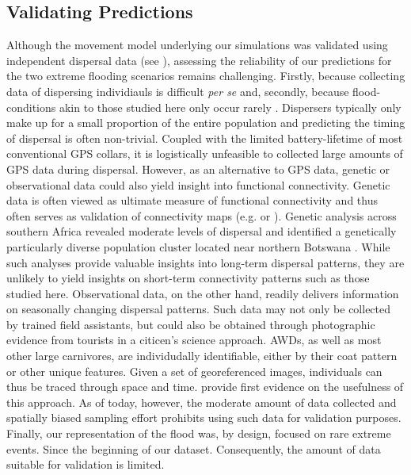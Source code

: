 \documentclass[abstract=on,10pt,a4paper,bibliography=totocnumbered]{article}
\begin{document}
\subsection{Validating Predictions}
Although the movement model underlying our simulations was validated using
independent dispersal data (see \citealp{Hofmann.2023}), assessing the
reliability of our predictions for the two extreme flooding scenarios remains
challenging. Firstly, because collecting data of dispersing individiauls is
difficult \textit{per se} \citep{Fattebert.2015, Cozzi.2020} and, secondly,
because flood-conditions akin to those studied here only occur rarely
\citep{Wolski.2017}. Dispersers typically only make up for a small proportion of
the entire population and predicting the timing of dispersal is often
non-trivial. Coupled with the limited battery-lifetime of most conventional GPS
collars, it is logistically unfeasible to collected large amounts of GPS data
during dispersal. However, as an alternative to GPS data, genetic or
observational data could also yield insight into functional connectivity.
Genetic data is often viewed as ultimate measure of functional connectivity
\citep{Baguette.2013} and thus often serves as validation of connectivity maps
(e.g. \citealp{Cushman.2010} or \citealp{Spear.2010}). Genetic analysis across
southern Africa revealed moderate levels of dispersal and identified a
genetically particularly diverse population cluster located near northern
Botswana \citep{Tensen.2022}. While such analyses provide valuable insights into
long-term dispersal patterns, they are unlikely to yield insights on short-term
connectivity patterns such as those studied here. Observational data, on the
other hand, readily delivers information on seasonally changing dispersal
patterns. Such data may not only be collected by trained field assistants, but
could also be obtained through photographic evidence from tourists in a
citicen's science approach. AWDs, as well as most other large carnivores, are
individudally identifiable, either by their coat pattern or other unique
features. Given a set of georeferenced images, individuals can thus be traced
through space and time. \cite{Cozzi.2013} provide first evidence on the
usefulness of this approach. As of today, however, the moderate amount of data
collected and spatially biased sampling effort prohibits using such data for
validation purposes. Finally, our representation of the flood was, by design,
focused on rare extreme events. Since the beginning of our dataset.
Consequently, the amount of data suitable for validation is limited.
\end{document}

